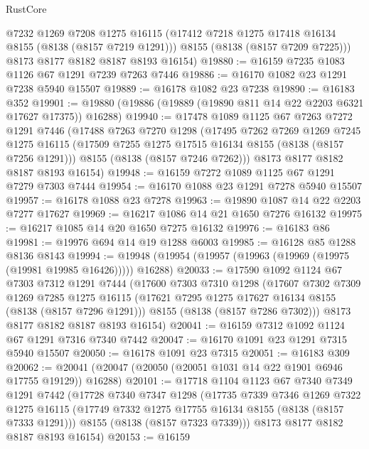 \begin{lexlean}{RustCore}
\begin{coremodule}
        @7232
        @1269
        @7208
        @1275
        @16115
        (@17412 @7218 @1275 @17418 @16134 @8155 (@8138 (@8157 @7219 @1291)))
        @8155
        (@8138 (@8157 @7209 @7225)))
      @8173
      @8177
      @8182
      @8187
      @8193
      @16154)
@19880 := @16159 @7235 @1083 @1126 @67 @1291 @7239 @7263 @7446
@19886 := @16170 @1082 @23 @1291 @7238 @5940 @15507
@19889 := @16178 @1082 @23 @7238
@19890 := @16183 @352
@19901 := @19880 (@19886 (@19889 (@19890 @811 @14 @22 @2203 @6321 @17627 @17375)) @16288)
@19940 := @17478
    @1089
    @1125
    @67
    @7263
    @7272
    @1291
    @7446
    (@17488
      @7263
      @7270
      @1298
      (@17495
        @7262
        @7269
        @1269
        @7245
        @1275
        @16115
        (@17509 @7255 @1275 @17515 @16134 @8155 (@8138 (@8157 @7256 @1291)))
        @8155
        (@8138 (@8157 @7246 @7262)))
      @8173
      @8177
      @8182
      @8187
      @8193
      @16154)
@19948 := @16159 @7272 @1089 @1125 @67 @1291 @7279 @7303 @7444
@19954 := @16170 @1088 @23 @1291 @7278 @5940 @15507
@19957 := @16178 @1088 @23 @7278
@19963 := @19890 @1087 @14 @22 @2203 @7277 @17627
@19969 := @16217 @1086 @14 @21 @1650 @7276 @16132
@19975 := @16217 @1085 @14 @20 @1650 @7275 @16132
@19976 := @16183 @86
@19981 := @19976 @694 @14 @19 @1288 @6003
@19985 := @16128 @85 @1288 @8136 @8143
@19994 := @19948 (@19954 (@19957 (@19963 (@19969 (@19975 (@19981 @19985 @16426))))) @16288)
@20033 := @17590
    @1092
    @1124
    @67
    @7303
    @7312
    @1291
    @7444
    (@17600
      @7303
      @7310
      @1298
      (@17607
        @7302
        @7309
        @1269
        @7285
        @1275
        @16115
        (@17621 @7295 @1275 @17627 @16134 @8155 (@8138 (@8157 @7296 @1291)))
        @8155
        (@8138 (@8157 @7286 @7302)))
      @8173
      @8177
      @8182
      @8187
      @8193
      @16154)
@20041 := @16159 @7312 @1092 @1124 @67 @1291 @7316 @7340 @7442
@20047 := @16170 @1091 @23 @1291 @7315 @5940 @15507
@20050 := @16178 @1091 @23 @7315
@20051 := @16183 @309
@20062 := @20041 (@20047 (@20050 (@20051 @1031 @14 @22 @1901 @6946 @17755 @19129)) @16288)
@20101 := @17718
    @1104
    @1123
    @67
    @7340
    @7349
    @1291
    @7442
    (@17728
      @7340
      @7347
      @1298
      (@17735
        @7339
        @7346
        @1269
        @7322
        @1275
        @16115
        (@17749 @7332 @1275 @17755 @16134 @8155 (@8138 (@8157 @7333 @1291)))
        @8155
        (@8138 (@8157 @7323 @7339)))
      @8173
      @8177
      @8182
      @8187
      @8193
      @16154)
@20153 := @16159

\end{coremodule}
\end{lexlean}
